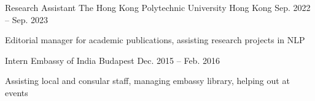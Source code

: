 
\begin{cventries}

  \cventry
    {Research Assistant} %
    {The Hong Kong Polytechnic University} %
    {Hong Kong} %
    {Sep. 2022 -- Sep. 2023} %
    {
      \begin{cvitems} %
        \item {Editorial manager for academic publications, assisting research projects in NLP}
      \end{cvitems}
    }

  \cventry
    {Intern} %
    {Embassy of India} %
    {Budapest} %
    {Dec. 2015 -- Feb. 2016} %
    {
      \begin{cvitems} %
        \item {Assisting local and consular staff, managing embassy library, helping out at events}
      \end{cvitems}
    }

\end{cventries}
